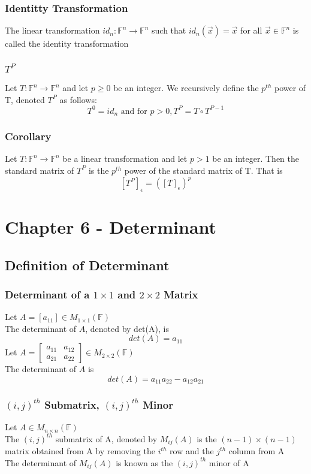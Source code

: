 \documentclass[12pt, letterpaper]{article}
\begin{document}
\subsubsection{Identitty Transformation}
The linear transformation $id_n: \mathbb{F}^n\rightarrow\mathbb{F}^n$ such that $id_n(\vec{x}) = \vec{x}$ for all $\vec{x}\in\mathbb{F}^n$ is called the identity transformation
\subsubsection{$T^P$}
Let $T: \mathbb{F}^n \rightarrow\mathbb{F}^n$ and let $p\geq 0$ be an integer. We recursively define the $p^{th}$ power of T, denoted $T^P$ as follows: 
\[T^0 = id_n \text{ and for } p>0, T^P = T\circ T^{P-1}\]
\subsubsection{Corollary}
Let $T: \mathbb{F}^n \rightarrow\mathbb{F}^n$ be a linear transformation and let $p>1$ be an integer. Then the standard matrix of $T^P$ is the $p^{th}$ power of the standard matrix of T. That is 
\[[T^P]_\epsilon = ([T]_\epsilon)^p\]

\section{Chapter 6 - Determinant}
\subsection{Definition of Determinant}
\subsubsection{Determinant of a $1\times1$ and $2\times2$ Matrix}
Let $A=[a_{11}]\in M_{1\times1}(\mathbb{F})$ \\
The determinant of $A$, denoted by det(A), is
\[det(A) = a_{11}\]
Let $A = \begin{bmatrix}a_{11}&a_{12} \\ a_{21}&a_{22}\end{bmatrix}\in M_{2\times2}(\mathbb{F})$ \\
The determinant of $A$ is 
\[det(A) = a_{11}a_{22} - a_{12}a_{21}\]
\subsubsection{$(i,j)^{th}$ Submatrix, $(i,j)^{th}$ Minor}
Let $A\in M_{n\times n}(\mathbb{F})$ \\
The $(i,j)^{th}$ submatrix of A, denoted by $M_{ij}(A)$ is the $(n-1)\times(n-1)$ matrix obtained from A by removing the $i^{th}$ row 
and the $j^{th}$ column from A \\
The determinant of $M_{ij}(A)$ is known as the $(i,j)^{th}$ minor of A 
\end{document}
